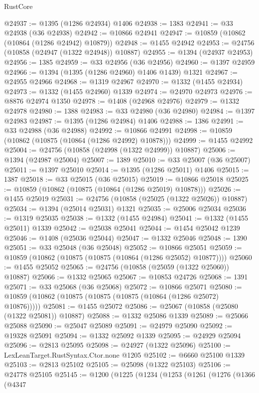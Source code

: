 \begin{lexlean}{RustCore}
\begin{coremodule}
@24937 := @1395 (@1286 @24934) @1406
@24938 := 1383
@24941 := @33 @24938 (@36 @24938)
@24942 := @10866 @24941
@24947 := @10859 (@10862 (@10864 (@1286 @24942) @10879))
@24948 := @1455 @24942
@24953 := @24756 (@10858 (@24947 (@1322 @24948)) @10887)
@24955 := @1394 (@24937 @24953)
@24956 := 1385
@24959 := @33 @24956 (@36 @24956)
@24960 := @1397 @24959
@24966 := @1394 (@1395 (@1286 @24960) @1406 @1439) @1321
@24967 := @24955 @24966
@24968 := @1319 @24967
@24970 := @1332 (@1455 @24934)
@24973 := @1332 (@1455 @24960) @1339
@24974 := @24970 @24973
@24976 := @8876 @24974 @1350
@24978 := @1408 (@24968 @24976)
@24979 := @1332 @24978
@24980 := 1388
@24983 := @33 @24980 (@36 @24980)
@24984 := @1397 @24983
@24987 := @1395 (@1286 @24984) @1406
@24988 := 1386
@24991 := @33 @24988 (@36 @24988)
@24992 := @10866 @24991
@24998 := @10859 (@10862 (@10875 (@10864 (@1286 @24992) @10878)))
@24999 := @1455 @24992
@25004 := @24756 (@10858 (@24998 (@1322 @24999)) @10887)
@25006 := @1394 (@24987 @25004)
@25007 := 1389
@25010 := @33 @25007 (@36 @25007)
@25011 := @1397 @25010
@25014 := @1395 (@1286 @25011) @1406
@25015 := 1387
@25018 := @33 @25015 (@36 @25015)
@25019 := @10866 @25018
@25025 := @10859 (@10862 (@10875 (@10864 (@1286 @25019) @10878)))
@25026 := @1455 @25019
@25031 := @24756 (@10858 (@25025 (@1322 @25026)) @10887)
@25034 := @1394 (@25014 @25031) @1321
@25035 := @25006 @25034
@25036 := @1319 @25035
@25038 := @1332 (@1455 @24984)
@25041 := @1332 (@1455 @25011) @1339
@25042 := @25038 @25041
@25044 := @1454 @25042 @1239
@25046 := @1408 (@25036 @25044)
@25047 := @1332 @25046
@25048 := 1390
@25051 := @33 @25048 (@36 @25048)
@25052 := @10866 @25051
@25059 := @10859 (@10862 (@10875 (@10875 (@10864 (@1286 @25052) @10877))))
@25060 := @1455 @25052
@25065 := @24756 (@10858 (@25059 (@1322 @25060)) @10887)
@25066 := @1332 @25065
@25067 := @10853 @24726
@25068 := 1391
@25071 := @33 @25068 (@36 @25068)
@25072 := @10866 @25071
@25080 := @10859 (@10862 (@10875 (@10875 (@10875 (@10864 (@1286 @25072) @10876)))))
@25081 := @1455 @25072
@25086 := @25067 (@10858 (@25080 (@1322 @25081)) @10887)
@25088 := @1332 @25086 @1339
@25089 := @25066 @25088
@25090 := @25047 @25089
@25091 := @24979 @25090
@25092 := @19328 @25091
@25094 := @1332 @25092 @1339
@25095 := @24929 @25094
@25096 := @2813 @25095
@25098 := @24927 (@1322 @25096)
@25100 := LexLeanTarget.RustSyntax.Ctor.none @1205
@25102 := @6660 @25100 @1339
@25103 := @2813 @25102
@25105 := @25098 (@1322 @25103)
@25106 := @24778 @25105
@25145 := @1200
    (@1225
      (@1234
        (@1253
          (@1261
            (@1276
              (@1366
                (@4347

\end{coremodule}
\end{lexlean}
